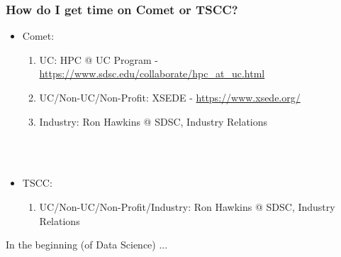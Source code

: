 \documentclass{beamer}
\begin{document}
\begin{frame}
   \frametitle{How do I get time on Comet or TSCC?}
   \begin{itemize}\setlength\itemsep{1.5em}
      \item Comet:
         \vspace{0.5em}
         \begin{enumerate}\setlength\itemsep{1.5em}
            \item UC: HPC @ UC Program - \url{https://www.sdsc.edu/collaborate/hpc\_at\_uc.html} 
            \item UC/Non-UC/Non-Profit: XSEDE - \url{https://www.xsede.org/} 
            \item Industry: Ron Hawkins @ SDSC, Industry Relations
         \end{enumerate}
      \ \\ \ \\
      \item TSCC:
         \vspace{0.5em}
         \begin{enumerate}\setlength\itemsep{1.5em}
            \item UC/Non-UC/Non-Profit/Industry: Ron Hawkins @ SDSC, Industry Relations
         \end{enumerate}
   \end{itemize}
\end{frame}

\begin{frame}
   In the beginning (of Data Science) ...
\end{frame}
\end{document}

